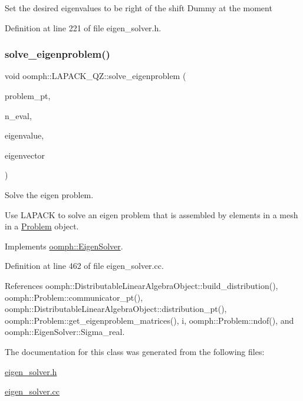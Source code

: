 Set the desired eigenvalues to be right of the shift Dummy at the moment 

Definition at line 221 of file eigen\+\_\+solver.\+h.

\mbox{\label{classoomph_1_1LAPACK__QZ_ae1efb27c494ea6fb0ce1267233c78f74}} 
\subsubsection{\texorpdfstring{solve\+\_\+eigenproblem()}{solve\_eigenproblem()}}
{\footnotesize\ttfamily void oomph\+::\+L\+A\+P\+A\+C\+K\+\_\+\+Q\+Z\+::solve\+\_\+eigenproblem (\begin{DoxyParamCaption}\item[{\hyperlink{classoomph_1_1Problem}{Problem} $\ast$const \&}]{problem\+\_\+pt,  }\item[{const int \&}]{n\+\_\+eval,  }\item[{\hyperlink{classoomph_1_1Vector}{Vector}$<$ std\+::complex$<$ double $>$ $>$ \&}]{eigenvalue,  }\item[{\hyperlink{classoomph_1_1Vector}{Vector}$<$ \hyperlink{classoomph_1_1DoubleVector}{Double\+Vector} $>$ \&}]{eigenvector }\end{DoxyParamCaption})\hspace{0.3cm}{\ttfamily [virtual]}}



Solve the eigen problem. 

Use L\+A\+P\+A\+CK to solve an eigen problem that is assembled by elements in a mesh in a \hyperlink{classoomph_1_1Problem}{Problem} object. 

Implements \hyperlink{classoomph_1_1EigenSolver_a6a6b09612ce16457b26fa0cfe996fa71}{oomph\+::\+Eigen\+Solver}.



Definition at line 462 of file eigen\+\_\+solver.\+cc.



References oomph\+::\+Distributable\+Linear\+Algebra\+Object\+::build\+\_\+distribution(), oomph\+::\+Problem\+::communicator\+\_\+pt(), oomph\+::\+Distributable\+Linear\+Algebra\+Object\+::distribution\+\_\+pt(), oomph\+::\+Problem\+::get\+\_\+eigenproblem\+\_\+matrices(), i, oomph\+::\+Problem\+::ndof(), and oomph\+::\+Eigen\+Solver\+::\+Sigma\+\_\+real.



The documentation for this class was generated from the following files\+:\begin{DoxyCompactItemize}
\item 
\hyperlink{eigen__solver_8h}{eigen\+\_\+solver.\+h}\item 
\hyperlink{eigen__solver_8cc}{eigen\+\_\+solver.\+cc}\end{DoxyCompactItemize}
